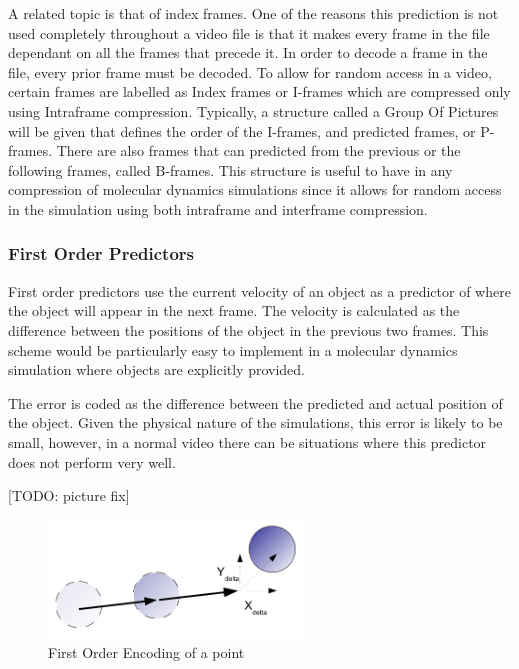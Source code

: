 \documentclass[a4paper,11pt]{report}
\begin{document}
A related topic is that of index frames. One of the reasons this prediction is not used completely throughout a video file is that it makes every frame in the file dependant on all the frames that precede it. In order to decode a frame in the file, every prior frame must be decoded. To allow for random access in a video, certain frames are labelled as Index frames or I-frames which are compressed only using Intraframe compression. Typically, a structure called a Group Of Pictures will be given that defines the order of the I-frames, and predicted frames, or P-frames\cite{vandalore2001sal}. There are also frames that can predicted from the previous or the following frames, called B-frames. This structure is useful to have in any compression of molecular dynamics simulations since it allows for random access in the simulation using both intraframe and interframe compression.

\subsubsection{First Order Predictors}

First order predictors use the current velocity of an object as a predictor of where the object will appear in the next frame. The velocity is calculated as the difference between the positions of the object in the previous two frames. This scheme would be particularly easy to implement in a molecular dynamics simulation where objects are explicitly provided.

The error is coded as the difference between the predicted and actual position of the object. Given the physical nature of the simulations, this error is likely to be small, however, in a normal video there can be situations where this predictor does not perform very well.

[TODO: picture fix]
\begin{figure}[h]
 \center
 \includegraphics[width=0.6\textwidth]{resources/FirstOrderEncoding.png}
\caption{First Order Encoding of a point}
\label{linearencoding}
\end{figure}
\end{document}
